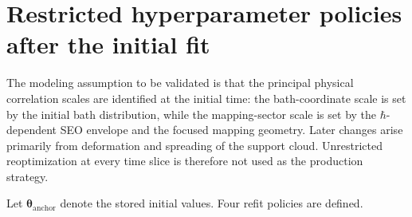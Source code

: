 \documentclass[
  11pt,
  letterpaper,
  onehalfspacing,
  normalmargins,
  equalmargins,
  oneside
]{ut-thesis}
\begin{document}
\section{Restricted hyperparameter policies after the initial fit}
\label{sec:gp-hyperparameter-policies}

The modeling assumption to be validated is that the principal physical correlation scales are
identified at the initial time: the bath-coordinate scale is set by the
initial bath distribution, while the mapping-sector scale is set by the
\(\hbar\)-dependent SEO envelope and the focused mapping geometry. Later
changes arise primarily from deformation and spreading of the support cloud.
Unrestricted reoptimization at every time slice is therefore not used as the
production strategy.

Let \(\boldsymbol\theta_{\mathrm{anchor}}\) denote the stored initial values.
Four refit policies are defined.
\end{document}
